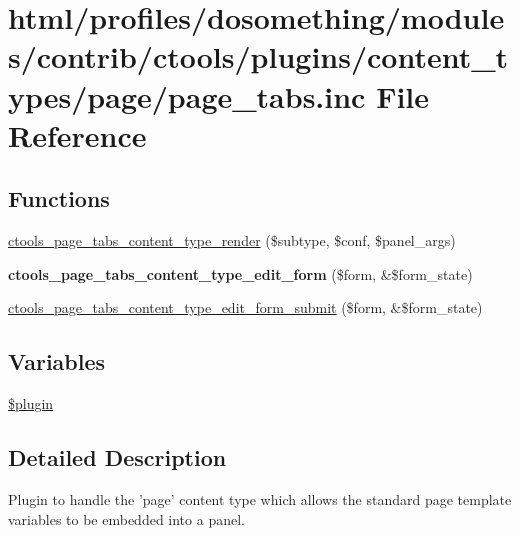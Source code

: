\hypertarget{page__tabs_8inc}{
\section{html/profiles/dosomething/modules/contrib/ctools/plugins/content\_\-types/page/page\_\-tabs.inc File Reference}
\label{page__tabs_8inc}
}
\subsection*{Functions}
\begin{DoxyCompactItemize}
\item 
\hyperlink{page__tabs_8inc_a8d5cf78bcb19f75cce8dec6726d2a3ca}{ctools\_\-page\_\-tabs\_\-content\_\-type\_\-render} (\$subtype, \$conf, \$panel\_\-args)
\item 
\hypertarget{page__tabs_8inc_aa39bc20b61006aac115582695654bbea}{
{\bfseries ctools\_\-page\_\-tabs\_\-content\_\-type\_\-edit\_\-form} (\$form, \&\$form\_\-state)}
\label{page__tabs_8inc_aa39bc20b61006aac115582695654bbea}

\item 
\hyperlink{page__tabs_8inc_af19d945db367ac5431f0e53b204ff621}{ctools\_\-page\_\-tabs\_\-content\_\-type\_\-edit\_\-form\_\-submit} (\$form, \&\$form\_\-state)
\end{DoxyCompactItemize}
\subsection*{Variables}
\begin{DoxyCompactItemize}
\item 
\hyperlink{page__tabs_8inc_ada8a7130088351710bb02ed622d6bf65}{\$plugin}
\end{DoxyCompactItemize}


\subsection{Detailed Description}
Plugin to handle the 'page' content type which allows the standard page template variables to be embedded into a panel. 

